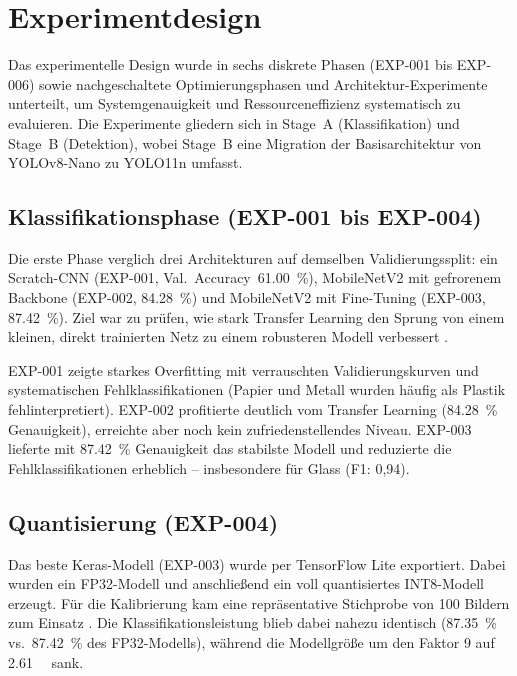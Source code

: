 \section{Experimentdesign}

Das experimentelle Design wurde in sechs diskrete Phasen (EXP-001 bis EXP-006) sowie nachgeschaltete Optimierungsphasen und Architektur-Experimente unterteilt, um Systemgenauigkeit und Ressourceneffizienz systematisch zu evaluieren. Die Experimente gliedern sich in Stage~A (Klassifikation) und Stage~B (Detektion), wobei Stage~B eine Migration der Basisarchitektur von YOLOv8-Nano zu YOLO11n umfasst.

\subsection{Klassifikationsphase (EXP-001 bis EXP-004)}
Die erste Phase verglich drei Architekturen auf demselben Validierungssplit: ein Scratch-CNN (EXP-001, Val.~Accuracy~\SI{61.00}{\percent}), MobileNetV2 mit gefrorenem Backbone (EXP-002, \SI{84.28}{\percent}) und MobileNetV2 mit Fine-Tuning (EXP-003, \SI{87.42}{\percent}). Ziel war zu prüfen, wie stark Transfer Learning den Sprung von einem kleinen, direkt trainierten Netz zu einem robusteren Modell verbessert \cite{yosinski2014transferable}.

EXP-001 zeigte starkes Overfitting mit verrauschten Validierungskurven und systematischen Fehlklassifikationen (Papier und Metall wurden häufig als Plastik fehlinterpretiert). EXP-002 profitierte deutlich vom Transfer Learning (\SI{84.28}{\percent} Genauigkeit), erreichte aber noch kein zufriedenstellendes Niveau. EXP-003 lieferte mit \SI{87.42}{\percent} Genauigkeit das stabilste Modell und reduzierte die Fehlklassifikationen erheblich -- insbesondere für Glass (F1: 0,94).

\subsection{Quantisierung (EXP-004)}
Das beste Keras-Modell (EXP-003) wurde per TensorFlow Lite exportiert. Dabei wurden ein FP32-Modell und anschließend ein voll quantisiertes INT8-Modell erzeugt. Für die Kalibrierung kam eine repräsentative Stichprobe von 100 Bildern zum Einsatz \cite{deng2020model}. Die Klassifikationsleistung blieb dabei nahezu identisch (\SI{87.35}{\percent} vs.\ \SI{87.42}{\percent} des FP32-Modells), während die Modellgröße um den Faktor 9 auf \SI{2.61}{\mega\byte} sank.

